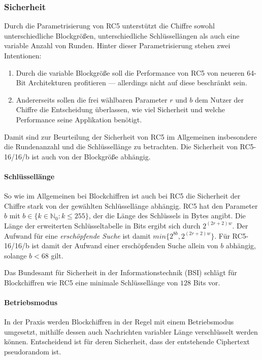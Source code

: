 \documentclass[course=erap]{aspdoc}
\begin{document}
\subsubsection{Sicherheit}
\label{sec:Sicherheit}

Durch die Parametrisierung von RC5\cite[p.2]{rc5rev} unterstützt die Chiffre sowohl unterschiedliche Blockgrößen, unterschiedliche Schlüssellängen als auch eine variable Anzahl von Runden. Hinter dieser Parametrisierung stehen zwei Intentionen:

\begin{enumerate}
    \item Durch die variable Blockgröße soll die Performance von RC5 von neueren 64-Bit Architekturen profitieren --- allerdings nicht auf diese beschränkt sein.\cite[p.1]{rc5rev}
    \item Andererseits sollen die frei wählbaren Parameter $r$ und $b$ dem Nutzer der Chiffre die Entscheidung überlassen, wie viel Sicherheit und welche Performance seine Applikation benötigt.\cite[p.1]{rc5rev}
\end{enumerate}

Damit sind zur Beurteilung der Sicherheit von RC5 im Allgemeinen insbesondere die Rundenanzahl und die Schlüssellänge zu betrachten. Die Sicherheit von RC5-16/16/b ist auch von der Blockgröße abhängig.

\paragraph{Schlüssellänge} So wie im Allgemeinen bei Blockchiffren ist auch bei RC5 die Sicherheit der Chiffre stark von der gewählten Schlüssellänge abhängig. RC5 hat den Parameter $b$ mit $b \in \{k \in \mathbb{N}_0 \colon k \leq 255\}$, der die Länge des Schlüssels in Bytes angibt.\cite[p.3]{rc5rev} Die Länge der erweiterten Schlüsseltabelle in Bits ergibt sich durch $2^{(2r + 2)w}$.\cite[p.2]{rc5rev} Der Aufwand für eine \textit{erschöpfende Suche} ist damit $min\{2^{8b}, 2^{(2r + 2)w}\}$.\cite[p.29]{kaliski+yin} Für RC5-16/16/b ist damit der Aufwand einer erschöpfenden Suche allein von $b$ abhängig, solange $b < 68$ gilt.\bigbreak

Das Bundesamt für Sicherheit in der Informationstechnik (BSI) schlägt für Blockchiffren wie RC5 eine minimale Schlüssellänge von $128$ Bits vor.\cite[p.21]{bsi}

\paragraph{Betriebsmodus} In der Praxis werden Blockchiffren in der Regel mit einem Betriebsmodus umgesetzt, mithilfe dessen auch Nachrichten variabler Länge verschlüsselt werden können. Entscheidend ist für deren Sicherheit, dass der entstehende Ciphertext pseudorandom ist.\bigbreak
\end{document}
